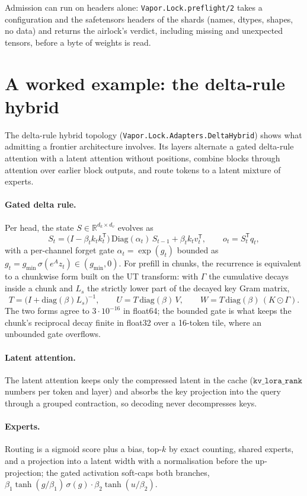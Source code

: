 Admission can run on headers alone: \texttt{Vapor.Lock.preflight/2} takes a configuration and the
safetensors headers of the shards (names, dtypes, shapes, no data) and returns the airlock's verdict,
including missing and unexpected tensors, before a byte of weights is read.

\section{A worked example: the delta-rule hybrid}

The delta-rule hybrid topology (\texttt{Vapor.Lock.Adapters.DeltaHybrid}) shows what admitting a
frontier architecture involves. Its layers alternate a gated delta-rule attention with a latent attention
without positions, combine blocks through attention over earlier block outputs, and route tokens to a
latent mixture of experts.

\paragraph{Gated delta rule.} Per head, the state $S \in \mathbb{R}^{d_k \times d_v}$ evolves as
\[
  S_t = \bigl(I - \beta_t k_t k_t^{\mathsf T}\bigr)\,\mathrm{Diag}(\alpha_t)\,S_{t-1} + \beta_t k_t v_t^{\mathsf T},
  \qquad o_t = S_t^{\mathsf T} q_t ,
\]
with a per-channel forget gate $\alpha_t = \exp(g_t)$ bounded as $g_t = g_{\min}\,\sigma(e^{A} z_t) \in
(g_{\min}, 0)$. For prefill in chunks, the recurrence is equivalent to a chunkwise form built on the UT
transform: with $\Gamma$ the cumulative decays inside a chunk and $L_s$ the strictly lower part of the
decayed key Gram matrix,
\[
  T = \bigl(I + \mathrm{diag}(\beta) L_s\bigr)^{-1},\qquad
  U = T\,\mathrm{diag}(\beta)\,V,\qquad
  W = T\,\mathrm{diag}(\beta)\,(K \odot \Gamma).
\]
The two forms agree to $3\cdot 10^{-16}$ in float64; the bounded gate is what keeps the chunk's
reciprocal decay finite in float32 over a 16-token tile, where an unbounded gate overflows.

\paragraph{Latent attention.} The latent attention keeps only the compressed latent in the cache
($\texttt{kv\_lora\_rank}$ numbers per token and layer) and absorbs the key projection into the query
through a grouped contraction, so decoding never decompresses keys.

\paragraph{Experts.} Routing is a sigmoid score plus a bias, top-$k$ by exact counting, shared experts,
and a projection into a latent width with a normalisation before the up-projection; the gated activation
soft-caps both branches, $\beta_1\tanh(g/\beta_1)\,\sigma(g)\cdot\beta_2\tanh(u/\beta_2)$.

